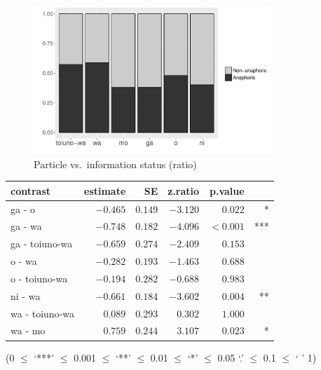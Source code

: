 \begin{figure}
\begin{center}
  \includegraphics[width=0.8\textwidth]{figure/ParInfoStatus.pdf}
  \caption{Particle vs.\ information status (ratio)}
  \label{ParInfoStatusCTF}
\end{center}
\end{figure}

\begin{table}
 \begin{center}
 \label{Par:InfoStatusPar:LSMEANST}
 \begin{tabular}{lrrrrr}
 \toprule
 contrast      &    estimate &        SE & z.ratio & p.value & \\
 \midrule
  ga - o         & $-0.465$ & $0.149$ & $-3.120$ &  $0.022$ & * \\
  ga - wa        & $-0.748$ & $0.182$ & $-4.096$ & $<0.001$ & *** \\
  ga - toiuno-wa & $-0.659$ & $0.274$ & $-2.409$ &  $0.153$ &  \\
  o - wa         & $-0.282$ & $0.193$ & $-1.463$ &  $0.688$ &  \\
  o - toiuno-wa  & $-0.194$ & $0.282$ & $-0.688$ &  $0.983$ &  \\
  ni - wa        & $-0.661$ & $0.184$ & $-3.602$ &  $0.004$ & ** \\
  wa - toiuno-wa & $ 0.089$ & $0.293$ & $ 0.302$ &  $1.000$ &  \\
  wa - mo        & $ 0.759$ & $0.244$ & $ 3.107$ &  $0.023$ & * \\
 \bottomrule
 \end{tabular}
 \end{center}
\hfill{(0 $\le$ `***' $\le$ 0.001 $\le$ `**' $\le$ 0.01 $\le$ `*' $\le$ 0.05 `.' $\le$ 0.1 $\le$ ` ' 1)}
\end{table}

